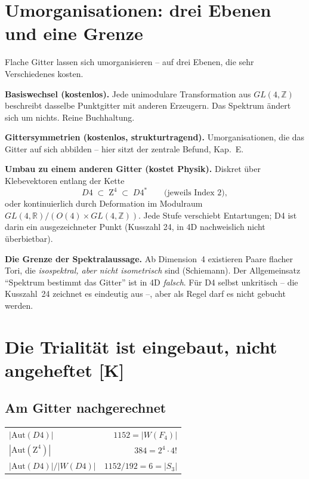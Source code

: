 \chapter{Umorganisationen: drei Ebenen und eine Grenze}

Flache Gitter lassen sich umorganisieren -- auf drei Ebenen, die
sehr Verschiedenes kosten.

\textbf{Basiswechsel (kostenlos).} Jede unimodulare Transformation
aus $GL(4,\mathbb{Z})$ beschreibt dasselbe Punktgitter mit anderen
Erzeugern. Das Spektrum ändert sich um nichts. Reine Buchhaltung.

\textbf{Gittersymmetrien (kostenlos, strukturtragend).}
Umorganisationen, die das Gitter auf sich abbilden -- hier sitzt der
zentrale Befund, Kap.~E.

\textbf{Umbau zu einem anderen Gitter (kostet Physik).} Diskret über
Klebevektoren entlang der Kette
\begin{equation}
  D4 \;\subset\; \text{Z}^4 \;\subset\; D4^{*}
  \qquad\text{(jeweils Index 2)},
\end{equation}
oder kontinuierlich durch Deformation im Modulraum
$GL(4,\mathbb{R})/(O(4)\times GL(4,\mathbb{Z}))$. Jede Stufe
verschiebt Entartungen; D4 ist darin ein ausgezeichneter Punkt
(Kusszahl 24, in 4D nachweislich nicht überbietbar).

\textbf{Die Grenze der Spektralaussage.} Ab Dimension~4 existieren
Paare flacher Tori, die \emph{isospektral, aber nicht isometrisch}
sind (Schiemann). Der Allgemeinsatz \enquote{Spektrum bestimmt das
Gitter} ist in 4D \emph{falsch}. Für D4 selbst unkritisch -- die
Kusszahl~24 zeichnet es eindeutig aus --, aber als Regel darf es
nicht gebucht werden.

\chapter{Die Trialität ist eingebaut, nicht angeheftet [K]}

\section{Am Gitter nachgerechnet}

\begin{center}
\begin{tabular}{lr}
\toprule
$|\text{Aut}(D4)|$ & $1152 = |W(F_4)|$ \\
$|\text{Aut}(\text{Z}^4)|$ & $384 = 2^4\cdot4!$ \\
$|\text{Aut}(D4)|/|W(D4)|$ & $1152/192 = 6 = |S_3|$ \\
\bottomrule
\end{tabular}
\end{center}

